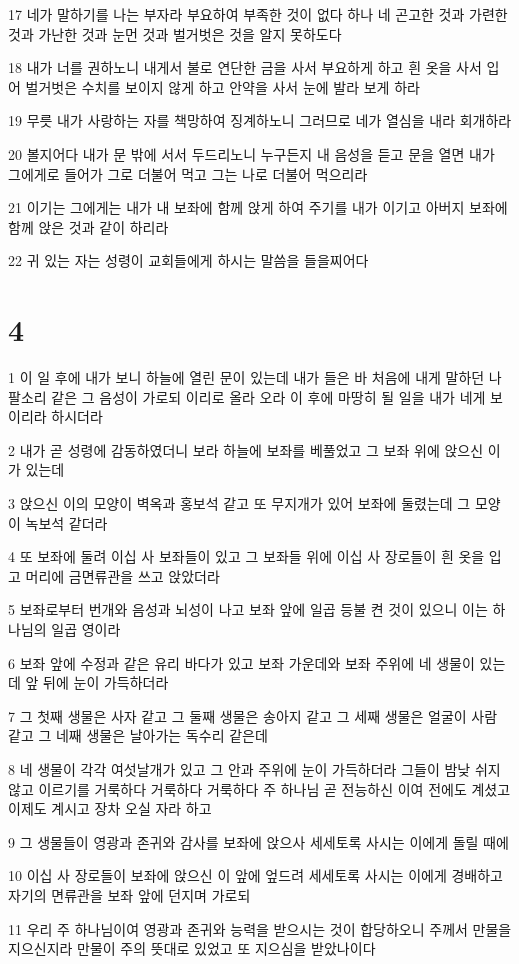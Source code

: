 \par 17 네가 말하기를 나는 부자라 부요하여 부족한 것이 없다 하나 네 곤고한 것과 가련한 것과 가난한 것과 눈먼 것과 벌거벗은 것을 알지 못하도다
\par 18 내가 너를 권하노니 내게서 불로 연단한 금을 사서 부요하게 하고 흰 옷을 사서 입어 벌거벗은 수치를 보이지 않게 하고 안약을 사서 눈에 발라 보게 하라
\par 19 무릇 내가 사랑하는 자를 책망하여 징계하노니 그러므로 네가 열심을 내라 회개하라
\par 20 볼지어다 내가 문 밖에 서서 두드리노니 누구든지 내 음성을 듣고 문을 열면 내가 그에게로 들어가 그로 더불어 먹고 그는 나로 더불어 먹으리라
\par 21 이기는 그에게는 내가 내 보좌에 함께 앉게 하여 주기를 내가 이기고 아버지 보좌에 함께 앉은 것과 같이 하리라
\par 22 귀 있는 자는 성령이 교회들에게 하시는 말씀을 들을찌어다

\chapter{4}

\par 1 이 일 후에 내가 보니 하늘에 열린 문이 있는데 내가 들은 바 처음에 내게 말하던 나팔소리 같은 그 음성이 가로되 이리로 올라 오라 이 후에 마땅히 될 일을 내가 네게 보이리라 하시더라
\par 2 내가 곧 성령에 감동하였더니 보라 하늘에 보좌를 베풀었고 그 보좌 위에 앉으신 이가 있는데
\par 3 앉으신 이의 모양이 벽옥과 홍보석 같고 또 무지개가 있어 보좌에 둘렸는데 그 모양이 녹보석 같더라
\par 4 또 보좌에 둘려 이십 사 보좌들이 있고 그 보좌들 위에 이십 사 장로들이 흰 옷을 입고 머리에 금면류관을 쓰고 앉았더라
\par 5 보좌로부터 번개와 음성과 뇌성이 나고 보좌 앞에 일곱 등불 켠 것이 있으니 이는 하나님의 일곱 영이라
\par 6 보좌 앞에 수정과 같은 유리 바다가 있고 보좌 가운데와 보좌 주위에 네 생물이 있는데 앞 뒤에 눈이 가득하더라
\par 7 그 첫째 생물은 사자 같고 그 둘째 생물은 송아지 같고 그 세째 생물은 얼굴이 사람 같고 그 네째 생물은 날아가는 독수리 같은데
\par 8 네 생물이 각각 여섯날개가 있고 그 안과 주위에 눈이 가득하더라 그들이 밤낮 쉬지 않고 이르기를 거룩하다 거룩하다 거룩하다 주 하나님 곧 전능하신 이여 전에도 계셨고 이제도 계시고 장차 오실 자라 하고
\par 9 그 생물들이 영광과 존귀와 감사를 보좌에 앉으사 세세토록 사시는 이에게 돌릴 때에
\par 10 이십 사 장로들이 보좌에 앉으신 이 앞에 엎드려 세세토록 사시는 이에게 경배하고 자기의 면류관을 보좌 앞에 던지며 가로되
\par 11 우리 주 하나님이여 영광과 존귀와 능력을 받으시는 것이 합당하오니 주께서 만물을 지으신지라 만물이 주의 뜻대로 있었고 또 지으심을 받았나이다

